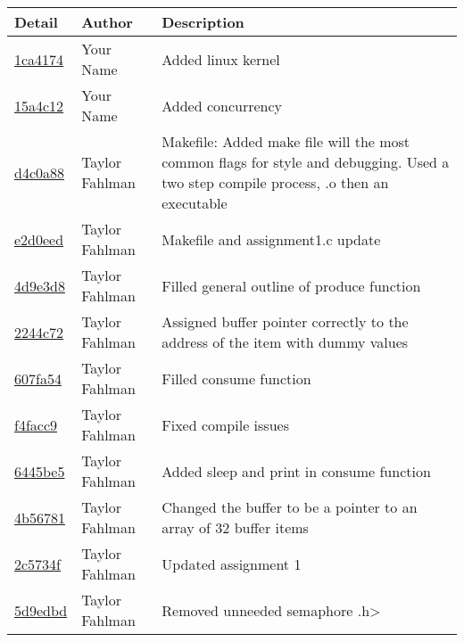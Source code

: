 \begin{tabular}{l l l}\textbf{Detail} & \textbf{Author} & \textbf{Description}\\\hline
\href{https://github.com/fahlmant/cs444/commit/1ca41740bd9248799f23d5798a4a82d99e63ba5a}{1ca4174} & Your Name & Added linux kernel\\\hline
\href{https://github.com/fahlmant/cs444/commit/15a4c12977816ab8bab1fe5f5a9b3c3774a8367a}{15a4c12} & Your Name & Added concurrency\\\hline
\href{https://github.com/fahlmant/cs444/commit/d4c0a889450f5e33eeee262f56cea203a29aed0a}{d4c0a88} & Taylor Fahlman & Makefile:     Added make file will the most common flags for style and debugging. Used a two step compile process, .o then an executable\\\hline
\href{https://github.com/fahlmant/cs444/commit/e2d0eedfaec7397cf59d7f1fd46886026f0f1727}{e2d0eed} & Taylor Fahlman & Makefile and assignment1.c update\\\hline
\href{https://github.com/fahlmant/cs444/commit/4d9e3d84c0309caf5af3ca5aed2af08010b2ef85}{4d9e3d8} & Taylor Fahlman & Filled general outline of produce function\\\hline
\href{https://github.com/fahlmant/cs444/commit/2244c720455b015276a94f97610bd3e710e41705}{2244c72} & Taylor Fahlman & Assigned buffer pointer correctly to the address of the item with dummy values\\\hline
\href{https://github.com/fahlmant/cs444/commit/607fa54aeb02833e23feaaebe3ca42504e86a20c}{607fa54} & Taylor Fahlman & Filled consume function\\\hline
\href{https://github.com/fahlmant/cs444/commit/f4facc9d5a16eb42168ac97078b0f487a08a407c}{f4facc9} & Taylor Fahlman & Fixed compile issues\\\hline
\href{https://github.com/fahlmant/cs444/commit/6445be50d9acb170ec3adaa80fe9418b160faf23}{6445be5} & Taylor Fahlman & Added sleep and print in consume function\\\hline
\href{https://github.com/fahlmant/cs444/commit/4b56781b7d05dd3c5653e92d8b3bfe43374a4190}{4b56781} & Taylor Fahlman & Changed the buffer to be a pointer to an array of 32 buffer items\\\hline
\href{https://github.com/fahlmant/cs444/commit/2c5734f5d2cbbf0650eefb5acbf3da30c458f406}{2c5734f} & Taylor Fahlman & Updated assignment 1\\\hline
\href{https://github.com/fahlmant/cs444/commit/5d9edbd4229b7263d39225f1ec581258af623a3d}{5d9edbd} & Taylor Fahlman & Removed unneeded semaphore .h>\\\hline

\end{tabular}
